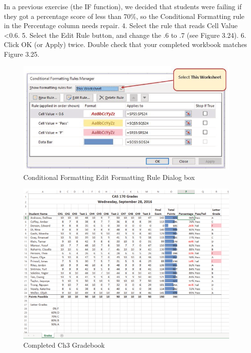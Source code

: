 In a previous exercise (the IF function), we decided that students were failing if they got a
percentage score of less than 70\%, so the Conditional Formatting rule in the Percentage column
needs repair.
4. Select the rule that reads Cell Value <0.6.
5. Select the Edit Rule button, and change the .6 to .7 (see Figure 3.24).
6. Click OK (or Apply) twice. Double check that your completed workbook matches Figure 3.25.


\begin{figure}[H]
	\centering
	\includegraphics[width=\maxwidth{.95\linewidth}]{gfx/ch03_fig24}
	\caption{Conditional Formatting Edit Formatting Rule Dialog box}
	\label{03:fig24}
\end{figure}

\begin{figure}[H]
	\centering
	\includegraphics[width=\maxwidth{.95\linewidth}]{gfx/ch03_fig25}
	\caption{Completed Ch3 Gradebook}
	\label{03:fig25}
\end{figure}


